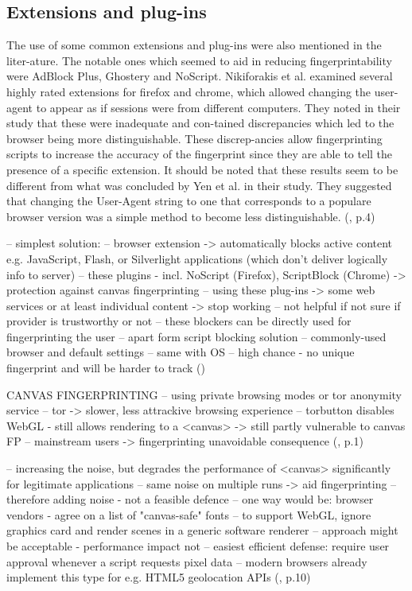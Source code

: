\subsection{Extensions and plug-ins}
The use of some common extensions and plug-ins were also mentioned in the liter-ature. The notable ones which seemed to aid in reducing fingerprintability were AdBlock Plus, Ghostery and NoScript. Nikiforakis et al. examined several highly rated extensions for firefox and chrome, which allowed changing the user-agent to appear as if sessions were from different computers. They noted in their study that these were inadequate and con-tained discrepancies which led to the browser being more distinguishable. These discrep-ancies allow fingerprinting scripts to increase the accuracy of the fingerprint since they are able to tell the presence of a specific extension. It should be noted that these results seem to be different from what was concluded by Yen et al. in their study. They suggested that changing the User-Agent string to one that corresponds to a populare browser version was a simple method to become less distinguishable. 
(\textcite{upi15}, p.4)


-- simplest solution:
-- browser extension -> automatically blocks active content e.g. JavaScript, Flash, or Silverlight applications (which don't deliver logically info to server)
-- these plugins - incl. NoScript (Firefox), ScriptBlock (Chrome) -> protection against canvas fingerprinting
-- using these plug-ins -> some web services or at least individual content -> stop working
-- not helpful if not sure if provider is trustworthy or not
-- these blockers can be directly used for fingerprinting the user
-- apart form script blocking solution
-- commonly-used browser and default settings
-- same with OS
-- high chance - no unique fingerprint and will be harder to track
(\textcite{web17})


CANVAS FINGERPRINTING
-- using private browsing modes or tor anonymity service
-- tor -> slower, less attrackive browsing experience
-- torbutton disables WebGL - still allows rendering to a <canvas> -> still partly vulnerable to canvas FP
-- mainstream users -> fingerprinting unavoidable consequence
(\textcite{mowery12}, p.1)

-- increasing the noise, but degrades the performance of <canvas> significantly for legitimate applications
-- same noise on multiple runs -> aid fingerprinting
-- therefore adding noise - not a feasible defence
-- one way would be: browser vendors - agree on a list of "canvas-safe" fonts
-- to support WebGL, ignore graphics card and render scenes in a generic software renderer
-- approach might be acceptable - performance impact not
-- easiest efficient defense: require user approval whenever a script requests pixel data 
-- modern browsers already implement this type for e.g. HTML5 geolocation APIs
(\textcite{mowery12}, p.10)

